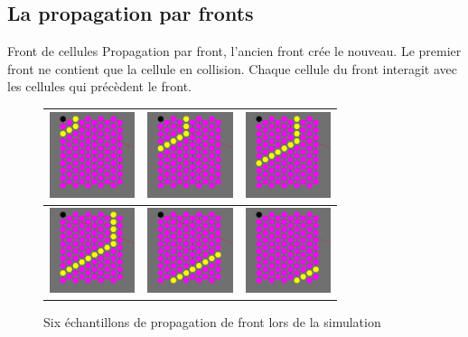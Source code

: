 \documentclass{beamer}
\begin{document}
\subsection{La propagation par fronts}
\begin{frame}{Front de cellules}
  Propagation par front, l’ancien front crée le nouveau. Le premier front ne contient que la cellule en collision.
  Chaque cellule du front interagit avec les cellules qui précèdent le front.
  \begin{figure}
    \begin{tabular}{|M|M|M|}
      \hline
      \includegraphics[width=2.5cm]{Images/front_1.png} &
      \includegraphics[width=2.5cm]{Images/front_2.png} &
      \includegraphics[width=2.5cm]{Images/front_3.png} \\
      \hline
      \includegraphics[width=2.5cm]{Images/front_4.png} &
      \includegraphics[width=2.5cm]{Images/front_5.png} &
      \includegraphics[width=2.5cm]{Images/front_6.png} \\
      \hline
    \end{tabular}
    \caption{Six échantillons de propagation de front lors de la simulation}
  \end{figure}
\end{frame}
\end{document}
